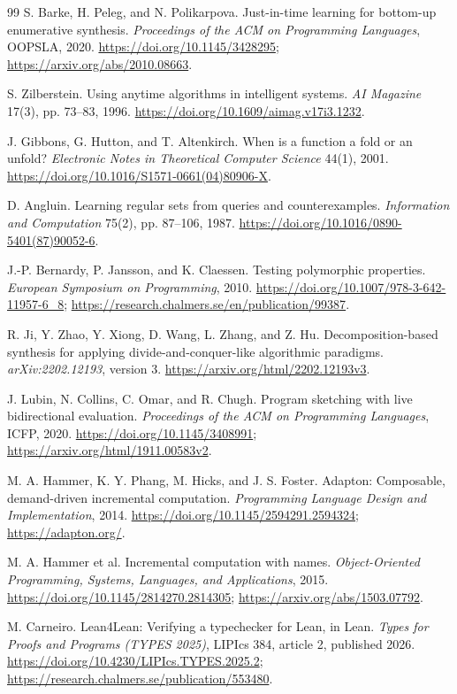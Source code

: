 \documentclass[11pt,a4paper]{article}
\theoremstyle{remark}
\begin{document}
\begin{thebibliography}{99}
 S. Barke, H. Peleg, and N. Polikarpova.
Just-in-time learning for bottom-up enumerative synthesis.
\emph{Proceedings of the ACM on Programming Languages}, OOPSLA, 2020.
\url{https://doi.org/10.1145/3428295};
\url{https://arxiv.org/abs/2010.08663}.

 S. Zilberstein.
Using anytime algorithms in intelligent systems.
\emph{AI Magazine} 17(3), pp. 73--83, 1996.
\url{https://doi.org/10.1609/aimag.v17i3.1232}.

 J. Gibbons, G. Hutton, and T. Altenkirch.
When is a function a fold or an unfold?
\emph{Electronic Notes in Theoretical Computer Science} 44(1), 2001.
\url{https://doi.org/10.1016/S1571-0661(04)80906-X}.

 D. Angluin.
Learning regular sets from queries and counterexamples.
\emph{Information and Computation} 75(2), pp. 87--106, 1987.
\url{https://doi.org/10.1016/0890-5401(87)90052-6}.

 J.-P. Bernardy, P. Jansson, and K. Claessen.
Testing polymorphic properties.
\emph{European Symposium on Programming}, 2010.
\url{https://doi.org/10.1007/978-3-642-11957-6_8};
\url{https://research.chalmers.se/en/publication/99387}.

 R. Ji, Y. Zhao, Y. Xiong, D. Wang, L. Zhang, and Z. Hu.
Decomposition-based synthesis for applying divide-and-conquer-like algorithmic paradigms.
\emph{arXiv:2202.12193}, version 3.
\url{https://arxiv.org/html/2202.12193v3}.

 J. Lubin, N. Collins, C. Omar, and R. Chugh.
Program sketching with live bidirectional evaluation.
\emph{Proceedings of the ACM on Programming Languages}, ICFP, 2020.
\url{https://doi.org/10.1145/3408991};
\url{https://arxiv.org/html/1911.00583v2}.

 M. A. Hammer, K. Y. Phang, M. Hicks, and J. S. Foster.
Adapton: Composable, demand-driven incremental computation.
\emph{Programming Language Design and Implementation}, 2014.
\url{https://doi.org/10.1145/2594291.2594324};
\url{https://adapton.org/}.

 M. A. Hammer et al.
Incremental computation with names.
\emph{Object-Oriented Programming, Systems, Languages, and Applications}, 2015.
\url{https://doi.org/10.1145/2814270.2814305};
\url{https://arxiv.org/abs/1503.07792}.

 M. Carneiro.
Lean4Lean: Verifying a typechecker for Lean, in Lean.
\emph{Types for Proofs and Programs (TYPES 2025)}, LIPIcs 384, article 2, published 2026.
\url{https://doi.org/10.4230/LIPIcs.TYPES.2025.2};
\url{https://research.chalmers.se/publication/553480}.


\end{thebibliography}
\end{document}
